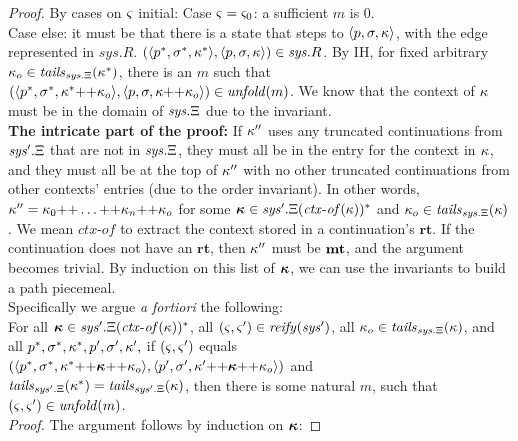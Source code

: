 \begin{proof}
\noindent By cases on $\varsigma$ initial:
Case $\varsigma = \varsigma_0$: a sufficient $m$ is 0.
\\
Case else: it must be that there is a state that steps to $\langle p,\sigma,\kappa \rangle$, with the edge represented in $\mathit{sys}.R$.
%
 $(\langle p^*,\sigma^*,\kappa^* \rangle,\langle p,\sigma,\kappa \rangle) \in \mathit{sys}.R$.
%
 By IH, for fixed arbitrary $\kappa_o \in \mathit{tails}_{\mathit{sys}.\Xi}(\kappa^*)$, there is an $m$ such that
 $(\langle p^*,\sigma^*,\kappa^* {\tt ++} \kappa_o \rangle,\langle p,\sigma,\kappa {\tt ++} \kappa_o \rangle) \in \mathit{unfold}(m)$.
 We know that the context of $\kappa$ must be in the domain of $\mathit{sys}.\Xi$ due to the invariant.
\\
\newcommand{\ctxof}{\mathit{ctx\text{-}of}}
 \textbf{The intricate part of the proof:}
 If $\kappa''$ uses any truncated continuations from $\mathit{sys}'.\Xi$ that are not in $\mathit{sys}.\Xi$, they must all be in the entry for the context in $\kappa$, and they must all be at the top of $\kappa''$ with no other truncated continuations from other contexts' entries (due to the order invariant).
 In other words, $\kappa''= \kappa_0 {\tt ++} \ldots {\tt ++} \kappa_n {\tt ++} \kappa_o$ for some $\vec{\mkont} \in \mathit{sys}'.\mktab(\ctxof(\mkont))^*$ and $\kappa_o \in \mathit{tails}_{\mathit{sys}.\Xi}(\kappa)$.
We mean $\ctxof$ to extract the context stored in a continuation's $\mathbf{rt}$.
%
If the continuation does not have an $\mathbf{rt}$, then $\kappa''$ must be $\mathbf{mt}$, and the argument becomes trivial.
 By induction on this list of $\vec{\mkont}$, we can use the invariants to build a path piecemeal.
\\
 Specifically we argue \emph{a fortiori} the following:
\\
 For all $\vec{\mkont} \in \mathit{sys}'.\mktab(\ctxof(\mkont))^*$,
 all $(\varsigma,\varsigma') \in \mathit{reify}(\mathit{sys}')$,
 all $\kappa_o \in \mathit{tails}_{\mathit{sys}.\Xi}(\kappa)$,
 and all $p^*,\sigma^*,\kappa^*,p',\sigma',\kappa',$ if $(\varsigma,\varsigma')$ equals
\\
$(\tpl{\mpoint^*,\mstore^*,\append{\mkont^*}{\append{\vec{\mkont}}{\mkont_o}}},\tpl{\mpoint',\mstore',\append{\mkont'}{\append{\vec{\mkont}}{\mkont_o}}})$ and
\\
 $\mathit{tails}_{\mathit{sys}'.\Xi}(\kappa^*) = \mathit{tails}_{\mathit{sys}'.\Xi}(\kappa)$, then there is some natural $m$, such that $(\varsigma,\varsigma') \in \mathit{unfold}(m)$.
\\
\textit{Proof.} The argument follows by induction on $\vec{\mkont}$:

\end{proof}
